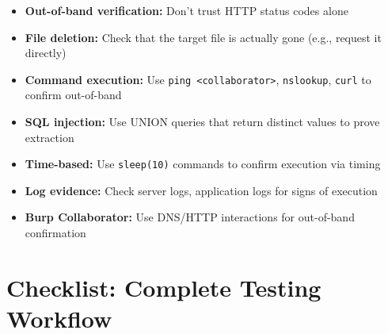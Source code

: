 \documentclass[11pt]{article}
\begin{document}
\begin{checklistbox}
\begin{itemize}
    \item[\checkmark] \textbf{Out-of-band verification:} Don't trust HTTP status codes alone
    \item[\checkmark] \textbf{File deletion:} Check that the target file is actually gone (e.g., request it directly)
    \item[\checkmark] \textbf{Command execution:} Use \texttt{ping <collaborator>}, \texttt{nslookup}, \texttt{curl} to confirm out-of-band
    \item[\checkmark] \textbf{SQL injection:} Use UNION queries that return distinct values to prove extraction
    \item[\checkmark] \textbf{Time-based:} Use \texttt{sleep(10)} commands to confirm execution via timing
    \item[\checkmark] \textbf{Log evidence:} Check server logs, application logs for signs of execution
    \item[\checkmark] \textbf{Burp Collaborator:} Use DNS/HTTP interactions for out-of-band confirmation
\end{itemize}
\end{checklistbox}

\section{Checklist: Complete Testing Workflow}
\end{document}

